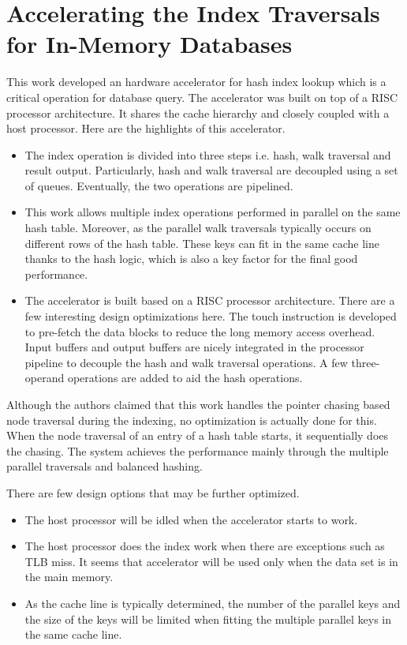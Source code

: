 \section{Accelerating the Index Traversals for In-Memory Databases}
This work \cite{kocberber2013meet} developed an hardware accelerator for hash index lookup which is a
critical operation for database query. The accelerator was built on top of a RISC
processor architecture. It shares the cache hierarchy and closely coupled with a
host processor. Here are the highlights of this accelerator.

\begin{itemize}
    \item The index operation is divided into three steps i.e. hash, walk
        traversal and result output. Particularly, hash and walk traversal are
        decoupled using a set of queues. Eventually, the two operations are
        pipelined. 
    \item This work allows multiple index operations performed in parallel on
        the same hash table. Moreover, as the parallel walk traversals typically
        occurs on different rows of the hash table. These keys can fit in the
        same cache line thanks to the hash logic, which is also a key factor for
        the final good performance.
    \item The accelerator is built based on a RISC processor architecture. There
        are a few interesting design optimizations here.
        \subitem The touch instruction is developed to pre-fetch the data blocks
        to reduce the long memory access overhead.
        \subitem Input buffers and output buffers are nicely integrated in the
        processor pipeline to decouple the hash and walk traversal operations.
        \subitem A few three-operand operations are added to aid the hash
        operations.
\end{itemize}

Although the authors claimed that this work handles the pointer chasing based
node traversal during the indexing, no optimization is actually done for this.
When the node traversal of an entry of a hash table starts, it sequentially does
the chasing. The system achieves the performance mainly through the multiple
parallel traversals and balanced hashing.

There are few design options that may be further optimized.
\begin{itemize}
    \item The host processor will be idled when the accelerator starts to work.
    \item The host processor does the index work when there are exceptions such
        as TLB miss. It seems that accelerator will be used only when the data
        set is in the main memory.
    \item As the cache line is typically determined, the number of the parallel keys and
        the size of the keys will be limited when fitting the multiple parallel
        keys in the same cache line.
\end{itemize}
